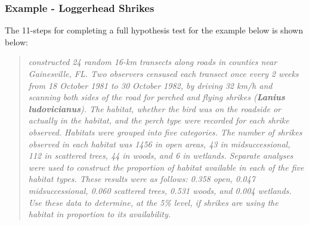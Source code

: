 \documentclass[10pt,openany]{book}\usepackage[]{graphicx}\usepackage[]{color}
\begin{document}

\subsubsection{Example - Loggerhead Shrikes}
The 11-steps  for completing a full hypothesis test for the example below is shown below:

\begin{quote}
\textsl{\cite{BohallWood1987} constructed 24 random 16-km transects along roads in counties near Gainesville, FL.  Two observers censused each transect once every 2 weeks from 18 October 1981 to 30 October 1982, by driving 32 km/h and scanning both sides of the road for perched and flying shrikes (\textbf{Lanius ludovicianus}).  The habitat, whether the bird was on the roadside or actually in the habitat, and the perch type were recorded for each shrike observed.  Habitats were grouped into five categories.  The number of shrikes observed in each habitat was 1456 in open areas, 43 in midsuccessional, 112 in scattered trees, 44 in woods, and 6 in wetlands.  Separate analyses were used to construct the proportion of habitat available in each of the five habitat types.  These results were as follows: 0.358 open, 0.047 midsuccessional, 0.060 scattered trees, 0.531 woods, and 0.004 wetlands.  Use these data to determine, at the 5\% level, if shrikes are using the habitat in proportion to its availability.}
\end{quote}
\end{document}
